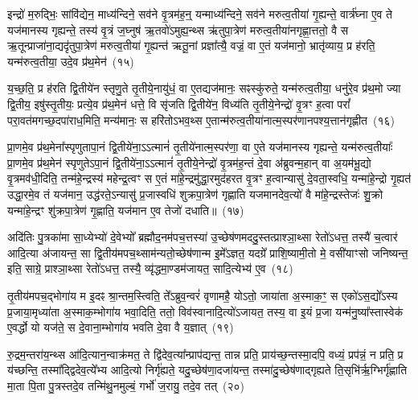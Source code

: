 {\anuvakamend[{तस्मा॑द॒सावा॑दि॒त्यस्त्रि॒ꣳ॒शच्च॑}]}

इन्द्रो॑ म॒रुद्भिः॒ सांवि॑द्येन॒ माध्य॑न्दिने॒ सव॑ने वृ॒त्रम॑ह॒न्॒ यन्माध्य॑न्दिने॒ सव॑ने मरुत्व॒तीया॑ गृ॒ह्यन्ते॒ वार्त्र॑घ्ना ए॒व ते यज॑मानस्य गृह्यन्ते॒ तस्य॑ वृ॒त्रं ज॒घ्नुष॑ ऋ॒तवो॑\-ऽमुह्य॒न्थ्स ऋ॑तुपा॒त्रेण॑ मरुत्व॒तीया॑नगृह्णा॒त्ततो॒ वै स ऋ॒तून्प्राजा॑ना॒द्यदृ॑तुपा॒त्रेण॑ मरुत्व॒तीया॑ गृ॒ह्यन्त॑ ऋतू॒नां प्रज्ञा᳚त्यै॒ वज्रं॒ वा ए॒तं यज॑मानो॒ भ्रातृ॑व्याय॒ प्र ह॑रति॒ यन्म॑रुत्व॒तीया॒ उदे॒व प्र॑थ॒मेन॑~(१५)\ip

य॒च्छ॒ति॒ प्र ह॑रति द्वि॒तीये॑न स्तृणु॒ते तृ॒तीये॒नायु॑धं॒ वा ए॒तद्यज॑मानः॒ सꣴस्कु॑रुते॒ यन्म॑रुत्व॒तीया॒ धनु॑रे॒व प्र॑थ॒मो ज्या द्वि॒तीय॒ इषु॑स्तृ॒तीयः॒ प्रत्ये॒व प्र॑थ॒मेन॑ धत्ते॒ वि सृ॑जति द्वि॒तीये॑न॒ विध्य॑ति तृ॒तीये॒नेन्द्रो॑ वृ॒त्रꣳ ह॒त्वा परां᳚ परा॒वत॑मगच्छ॒दपा॑राध॒मिति॒ मन्य॑मानः॒ स हरि॑तो\-ऽभव॒थ्स ए॒तान्म॑रुत्व॒तीया॑नात्म॒स्पर॑णानपश्य॒त्तान॑गृह्णीत~(१६)\ip

प्रा॒णमे॒व प्र॑थ॒मेना᳚स्पृणुतापा॒नं द्वि॒तीये॑ना॒\-ऽऽ\-त्मानं॑ तृ॒तीये॑नात्म॒स्पर॑णा॒ वा ए॒ते यज॑मानस्य गृह्यन्ते॒ यन्म॑रुत्व॒तीयाः᳚ प्रा॒णमे॒व प्र॑थ॒मेन॑ स्पृणुते\-ऽपा॒नं द्वि॒तीये॑ना॒\-ऽऽ\-त्मानं॑ तृ॒तीये॒नेन्द्रो॑ वृ॒त्रम॑ह॒न्तं दे॒वा अ॑ब्रुवन्म॒हान् वा अ॒यम॑भू॒द्यो वृ॒त्रमव॑धी॒दिति॒ तन्म॑हे॒न्द्रस्य॑ महेन्द्र॒त्वꣳ स ए॒तं मा॑हे॒न्द्रमु॑द्धा॒रमुद॑हरत वृ॒त्रꣳ ह॒त्वान्यासु॑ दे॒वता॒स्वधि॒ यन्मा॑हे॒न्द्रो गृ॒ह्यत॑ उद्धा॒रमे॒व तं यज॑मान॒ उद्ध॑रते॒\-ऽन्यासु॑ प्र॒जास्वधि॑ शुक्रपा॒त्रेण॑ गृह्णाति यजमानदेव॒त्यो॑ वै मा॑हे॒न्द्रस्तेजः॑ शु॒क्रो यन्मा॑हे॒न्द्रꣳ शु॑क्रपा॒त्रेण॑ गृ॒ह्णाति॒ यज॑मान ए॒व तेजो॑ दधाति॥~(१७)\ip

{\anuvakamend[{प्र॒थ॒मेना॑गृह्णीत दे॒वता᳚स्व॒ष्टाविꣳ॑शतिश्च}]}

अदि॑तिः पु॒त्रका॑मा सा॒ध्येभ्यो॑ दे॒वेभ्यो᳚ ब्रह्मौद॒नम॑पच॒त्तस्या॑ उ॒च्छेष॑णमददु॒स्तत्प्राश्ञा॒थ्सा रेतो॑\-ऽधत्त॒ तस्यै॑ च॒त्वार॑ आदि॒त्या अ॑जायन्त॒ सा द्वि॒तीय॑मपच॒थ्साम॑न्यतो॒च्छेष॑णान्म इ॒मे᳚\-ऽज्ञत॒ यदग्रे᳚ प्राशि॒ष्यामी॒तो मे॒ वसी॑याꣳसो जनिष्यन्त॒ इति॒ साग्रे॒ प्राश्ञा॒थ्सा रेतो॑\-ऽधत्त॒ तस्यै॒ व्यृ॑द्धमा॒ण्डम॑जायत॒ सादि॒त्येभ्य॑ ए॒व~(१८)\ip

तृ॒तीय॑मपच॒द्भोगा॑य म इ॒दꣴ श्रा॒न्तम॒स्त्विति॒ ते᳚\-ऽब्रुव॒न्वरं॑ वृणामहै॒ यो\-ऽतो॒ जाया॑ता अ॒स्माक॒ꣳ॒ स एको॑\-ऽस॒द्यो᳚\-ऽस्य प्र॒जाया॒मृध्या॑ता अ॒स्माक॒म्भोगा॑य भवा॒दिति॒ ततो॒ विव॑स्वानादि॒त्यो॑\-ऽजायत॒ तस्य॒ वा इ॒यं प्र॒जा यन्म॑नु॒ष्या᳚स्तास्वेक॑ ए॒वर्द्धो यो यज॑ते॒ स दे॒वाना॒म्भोगा॑य भवति दे॒वा वै य॒ज्ञात्~(१९)\ip

रु॒द्रम॒न्तरा॑य॒न्थ्स आ॑दि॒त्यान॒न्वाक्र॑मत॒ ते द्वि॑देव॒त्या᳚न्प्राप॑द्यन्त॒ तान्न प्रति॒ प्राय॑च्छ॒न्तस्मा॒दपि॒ वध्यं॒ प्रप॑न्नं॒ न प्रति॒ प्र य॑च्छन्ति॒ तस्मा᳚द्\-द्विदेव॒त्ये᳚भ्य आदि॒त्यो निर्गृ॑ह्यते॒ यदु॒च्छेष॑णा॒दजा॑यन्त॒ तस्मा॑दु॒च्छेष॑णाद्गृह्यते ति॒सृभि॑र्\mbox{}ऋ॒ग्भिर्गृ॑ह्णाति मा॒ता पि॒ता पु॒त्रस्तदे॒व तन्मि॑थु॒नमुल्बं॒ गर्भो॑ ज॒रायु॒ तदे॒व तत्~(२०)\ip

